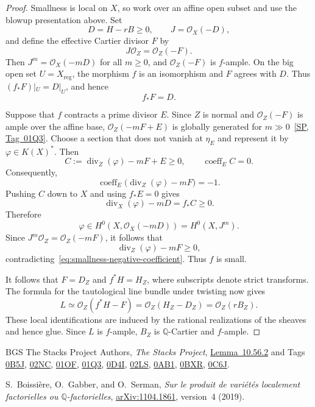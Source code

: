 \documentclass[11pt,a4paper]{article}
\theoremstyle{definition}
\theoremstyle{definition}
\newcommand{\OO}{\mathcal O}
\begin{document}
\begin{proof}
Smallness is local on $X$, so work over an affine open subset and use the blowup presentation above. Set
\[
 D=H-rB\ge0,\qquad J=\OO_X(-D),
\]
and define the effective Cartier divisor $F$ by
\[
 J\OO_Z=\OO_Z(-F).
\]
Then $J^m=\OO_X(-mD)$ for all $m\ge0$, and $\OO_Z(-F)$ is $f$-ample. On the big open set $U=X_{\mathrm{reg}}$, the morphism $f$ is an isomorphism and $F$ agrees with $D$. Thus $(f_*F)|_U=D|_U$, and hence
\[
 f_*F=D.
\]

Suppose that $f$ contracts a prime divisor $E$. Since $Z$ is normal and $\OO_Z(-F)$ is ample over the affine base, $\OO_Z(-mF+E)$ is globally generated for $m\gg0$~\href{https://stacks.math.columbia.edu/tag/01Q3}{[SP, Tag~01Q3]}. Choose a section that does not vanish at $\eta_E$ and represent it by $\varphi\in K(X)^*$. Then
\[
 C:=\operatorname{div}_Z(\varphi)-mF+E\ge0,
 \qquad \operatorname{coeff}_E C=0.
\]
Consequently,
\begin{equation}\label{eq:smallness-negative-coefficient}
 \operatorname{coeff}_E\bigl(\operatorname{div}_Z(\varphi)-mF\bigr)=-1.
\end{equation}
Pushing $C$ down to $X$ and using $f_*E=0$ gives
\[
 \operatorname{div}_X(\varphi)-mD=f_*C\ge0.
\]
Therefore
\[
 \varphi\in H^0(X,\OO_X(-mD))=H^0(X,J^m).
\]
Since $J^m\OO_Z=\OO_Z(-mF)$, it follows that
\[
 \operatorname{div}_Z(\varphi)-mF\ge0,
\]
contradicting~\eqref{eq:smallness-negative-coefficient}. Thus $f$ is small.

It follows that $F=D_Z$ and $f^*H=H_Z$, where subscripts denote strict transforms. The formula for the tautological line bundle under twisting now gives
\[
 L\simeq\OO_Z(f^*H-F)
 =\OO_Z(H_Z-D_Z)
 =\OO_Z(rB_Z).
\]
These local identifications are induced by the rational realizations of the sheaves and hence glue. Since $L$ is $f$-ample, $B_Z$ is $\mathbb Q$-Cartier and $f$-ample.
\end{proof}

\begin{thebibliography}{BGS}
The Stacks Project Authors,
\emph{The Stacks Project},
\href{https://stacks.math.columbia.edu/tag/0EGH}{Lemma~10.56.2}
and Tags
\href{https://stacks.math.columbia.edu/tag/0B5J}{0B5J},
\href{https://stacks.math.columbia.edu/tag/02NC}{02NC},
\href{https://stacks.math.columbia.edu/tag/01OF}{01OF},
\href{https://stacks.math.columbia.edu/tag/01Q3}{01Q3},
\href{https://stacks.math.columbia.edu/tag/0D4I}{0D4I},
\href{https://stacks.math.columbia.edu/tag/02LS}{02LS},
\href{https://stacks.math.columbia.edu/tag/0AB1}{0AB1},
\href{https://stacks.math.columbia.edu/tag/0BXR}{0BXR},
\href{https://stacks.math.columbia.edu/tag/0C6J}{0C6J}.

S.~Boissi\`ere, O.~Gabber, and O.~Serman,
\emph{Sur le produit de vari\'et\'es localement factorielles ou $\mathbb Q$-factorielles},
\href{https://arxiv.org/abs/1104.1861}{arXiv:1104.1861}, version~4 (2019).
\end{thebibliography}
\end{document}
